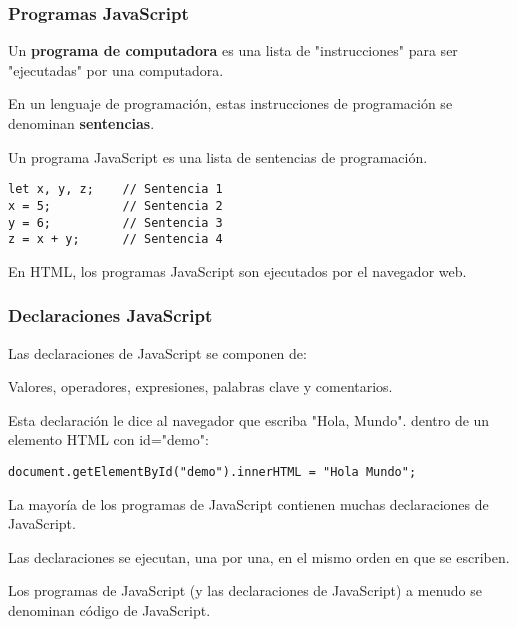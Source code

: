 \begin{frame}[fragile]
  \frametitle{Programas JavaScript}

  Un \textbf{programa de computadora} es una lista de
  "instrucciones" para ser "ejecutadas" por una computadora.

  \vspace{\baselineskip}
  En un lenguaje de programación, estas instrucciones de
  programación se denominan \textbf{sentencias}.

  \vspace{\baselineskip}
  Un programa JavaScript es una lista de sentencias de programación.

  \vspace{\baselineskip}
  \begin{lstlisting}
let x, y, z;    // Sentencia 1
x = 5;          // Sentencia 2
y = 6;          // Sentencia 3
z = x + y;      // Sentencia 4
  \end{lstlisting}

  \begin{exampleblock}{}
  En HTML, los programas JavaScript son ejecutados por el navegador web. 
  \end{exampleblock}
\end{frame}

\begin{frame}[fragile]
  \frametitle{Declaraciones JavaScript}

  Las declaraciones de JavaScript se componen de:

  \vspace{\baselineskip}
  Valores, operadores, expresiones, palabras clave y comentarios.

  \vspace{\baselineskip}
  Esta declaración le dice al navegador que escriba "Hola, Mundo".
  dentro de un elemento HTML con id="demo":

  \vspace{\baselineskip}
  \begin{lstlisting}
document.getElementById("demo").innerHTML = "Hola Mundo";
  \end{lstlisting}

  \vspace{\baselineskip}
  La mayoría de los programas de JavaScript contienen muchas
  declaraciones de JavaScript.

  Las declaraciones se ejecutan, una por una, en el mismo orden
  en que se escriben.

  \begin{exampleblock}{}
    Los programas de JavaScript (y las declaraciones de JavaScript) a menudo se denominan código de JavaScript.
  \end{exampleblock}
\end{frame}

